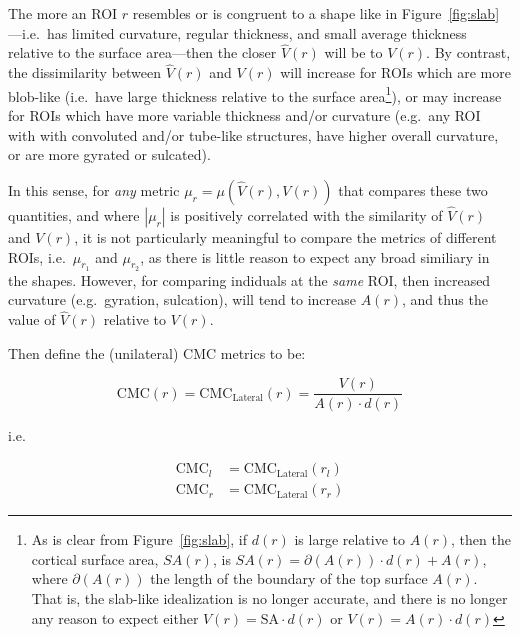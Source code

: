 \documentclass{article}
\begin{document}
The more an ROI
\(r\) resembles or is congruent to a shape like in
Figure~\ref{fig:slab}---i.e.\ has limited curvature, regular thickness, and
small average thickness relative to the surface area---then the closer
\(\hat{V}(r)\) will be to \(V(r)\). By contrast, the dissimilarity between
\(\hat{V}(r)\) and \(V(r)\) will increase for ROIs which are more blob-like
(i.e.\ have large thickness relative to the surface area\footnote{As is clear
from Figure~\ref{fig:slab}, if \(d(r)\) is large relative to \(A(r)\), then
the cortical surface area, \(SA(r)\), is \(SA(r) = \partial(A(r)) \cdot d(r)
+ A(r)\), where \(\partial(A(r))\) the length of the boundary of the top
surface \(A(r)\). That is, the slab-like idealization is no longer accurate,
and there is no longer any reason to expect either \(V(r) = \text{SA} \cdot
d(r)\) or \(V(r) = A(r) \cdot d(r)\)}), or may increase for ROIs which have
more variable thickness and/or curvature (e.g.\ any ROI with with convoluted
and/or tube-like structures, have higher overall curvature, or are more
gyrated or sulcated).



In this sense, for \emph{any} metric \(\mu_r = \mu(\hat{V}(r), V(r))\) that
compares these two quantities, and where \(|\mu_r|\) is positively correlated
with the similarity of \(\hat{V}(r)\) and \(V(r)\), it is not particularly
meaningful to compare the metrics of different ROIs, i.e.\ \(\mu_{r_1}\) and
\(\mu_{r_2}\), as there is little reason to expect any broad similiary in the
shapes. However, for comparing indiduals at the \emph{same} ROI, then
increased curvature (e.g.\ gyration, sulcation), will tend to increase
\(A(r)\), and thus the value of \(\hat{V}(r)\) relative to \(V(r)\).

Then define the (unilateral) CMC metrics to be:

\begin{equation}
\text{CMC}(r) = \text{CMC}_{\text{Lateral}}(r) = \frac{V(r)}{A(r) \cdot d(r)}
\end{equation}

i.e.\

\begin{align}
\label{eq:cmc-laterals}
\text{CMC}_l &= \text{CMC}_{\text{Lateral}}(r_l) \\
\text{CMC}_r &= \text{CMC}_{\text{Lateral}}(r_r)
\end{align}




%
\end{document}
